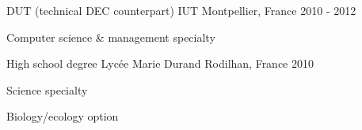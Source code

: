 \begin{cventries}
  \cventry
    {DUT (technical DEC counterpart)} %
    {IUT} %
    {Montpellier, France} %
    {2010 - 2012} %
    {
      \begin{cvitems} %
        \item {Computer science \& management specialty}
      \end{cvitems}
    }

  \cventry
    {High school degree} %
    {Lycée Marie Durand} %
    {Rodilhan, France} %
    {2010} %
    {
      \begin{cvitems} %
        \item {Science specialty}
        \item {Biology/ecology option}
      \end{cvitems}
    }

\end{cventries}
